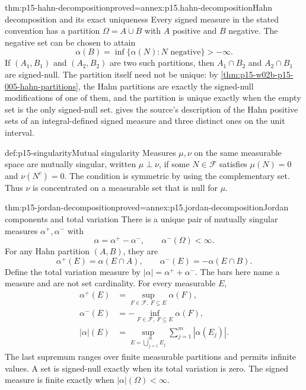 \begin{hbtheorem}{thm:p15-hahn-decomposition}{proved=annex:p15.hahn-decomposition}{Hahn decomposition and its exact uniqueness}
Every signed measure in the stated convention has a partition
\(\Omega=A\mathbin{\dot\cup}B\) with \(A\) positive and \(B\) negative.
The negative set can be chosen to attain
\[
                    \alpha(B)=\inf\{\alpha(N):N\text{ negative}\}>-\infty.
\]
If \((A_1,B_1)\) and \((A_2,B_2)\) are two such partitions, then
\(A_1\cap B_2\) and \(A_2\cap B_1\) are signed-null.
The partition itself need not be unique: by
\cref{thm:p15-w02b-p15-005-hahn-partitions}, the Hahn partitions are
exactly the signed-null modifications of one of them, and the partition is
unique exactly when the empty set is the only signed-null set.
 gives the source's description
of the Hahn positive sets of an integral-defined signed measure and three
distinct ones on the unit interval.
\end{hbtheorem}

\begin{hbdefinition}{def:p15-singularity}{Mutual singularity}
Measures \(\mu,\nu\) on the same measurable space are mutually singular,
written \(\mu\perp\nu\), if some \(N\in\mathcal F\) satisfies
\(\mu(N)=0\) and \(\nu(N^c)=0\).
The condition is symmetric by using the complementary set.
Thus \(\nu\) is concentrated on a measurable set that is null for \(\mu\).
\end{hbdefinition}

\begin{hbtheorem}{thm:p15-jordan-decomposition}{proved=annex:p15.jordan-decomposition}{Jordan components and total variation}
There is a unique pair of mutually singular measures
\(\alpha^+,\alpha^-\) with
\[
                 \alpha=\alpha^+-\alpha^-,
                 \qquad \alpha^-(\Omega)<\infty.
\]
For any Hahn partition \((A,B)\), they are
\[
           \alpha^+(E)=\alpha(E\cap A),\qquad
           \alpha^-(E)=-\alpha(E\cap B).
\]
Define the total variation measure by
\(\lvert\alpha\rvert=\alpha^++\alpha^-\).
The bars here name a measure and are not set cardinality.
For every measurable \(E\),
\[
 \begin{aligned}
 \alpha^+(E)&=\sup_{F\in\mathcal F,\ F\subseteq E}\alpha(F),\\
 \alpha^-(E)&=-\inf_{F\in\mathcal F,\ F\subseteq E}\alpha(F),\\
 \lvert\alpha\rvert(E)
   &=\sup_{E=\mathbin{\dot\bigcup}_{j=1}^m E_j}
                         \sum_{j=1}^m|\alpha(E_j)|.
 \end{aligned}
\]
The last supremum ranges over finite measurable partitions and permits
infinite values. A set is signed-null exactly when its total variation
is zero. The signed measure is finite exactly when
\(\lvert\alpha\rvert(\Omega)<\infty\).
\end{hbtheorem}

